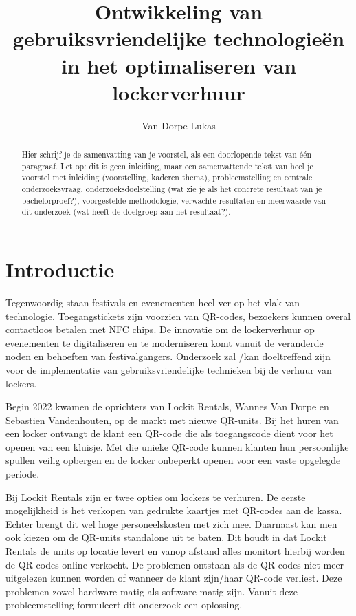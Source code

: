 \documentclass{hogent-article}
\title{Ontwikkeling van gebruiksvriendelijke technologieën in het optimaliseren van lockerverhuur}
\author{Van Dorpe Lukas}
\begin{document}
\begin{abstract}
  Hier schrijf je de samenvatting van je voorstel, als een doorlopende tekst van één paragraaf. Let op: dit is geen inleiding, maar een samenvattende tekst van heel je voorstel met inleiding (voorstelling, kaderen thema), probleemstelling en centrale onderzoeksvraag, onderzoeksdoelstelling (wat zie je als het concrete resultaat van je bachelorproef?), voorgestelde methodologie, verwachte resultaten en meerwaarde van dit onderzoek (wat heeft de doelgroep aan het resultaat?).
\end{abstract}

\tableofcontents

% 


\section{Introductie}%
\label{sec:introductie}

Tegenwoordig staan festivals en evenementen heel ver op het vlak van technologie. Toegangstickets zijn voorzien van QR-codes, bezoekers kunnen overal contactloos betalen met NFC chips. De innovatie om de lockerverhuur op evenementen te digitaliseren en te moderniseren komt vanuit de veranderde noden en behoeften van festivalgangers. Onderzoek zal /kan doeltreffend zijn voor de implementatie van gebruiksvriendelijke technieken bij de verhuur van lockers.

Begin 2022 kwamen de oprichters van Lockit Rentals, Wannes Van Dorpe en Sebastien Vandenhouten, op de markt met nieuwe QR-units. Bij het huren van een locker ontvangt de klant een QR-code die als toegangscode dient voor het openen van een kluisje. Met die unieke QR-code kunnen klanten hun persoonlijke spullen veilig opbergen en de locker onbeperkt openen voor een vaste opgelegde periode. 

Bij Lockit Rentals zijn er twee opties om lockers te verhuren. De eerste mogelijkheid is het verkopen van gedrukte kaartjes met QR-codes aan de kassa. Echter brengt dit wel hoge personeelskosten met zich mee. Daarnaast kan men ook kiezen om de QR-units standalone uit te baten. Dit houdt in dat Lockit Rentals de units op locatie levert en vanop afstand alles monitort hierbij worden de QR-codes online verkocht. De problemen ontstaan als de QR-codes niet meer uitgelezen kunnen worden of wanneer de klant zijn/haar QR-code verliest. Deze problemen zowel hardware matig als software matig zijn. Vanuit deze probleemstelling formuleert dit onderzoek een oplossing.  
\end{document}
